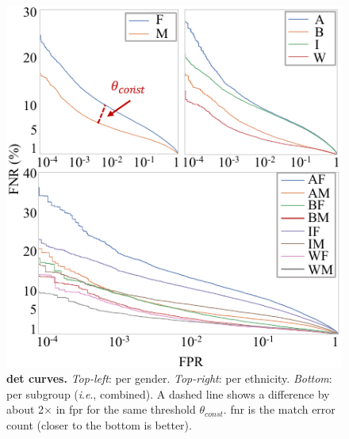 \documentclass[10pt,twocolumn,letterpaper]{article}
\newcommand{\ie}{\textit{i}.\textit{e}., }
\begin{document}
\begin{figure}[!t] 
	\centering    
	\includegraphics[width=\linewidth]{figures/detcurve-improved.pdf}
		\caption{\textbf{\gls{det} curves.} \emph{Top-left}: per gender. \emph{Top-right}: per ethnicity. \emph{Bottom}: per subgroup (\ie combined). A dashed line shows a difference by about 2$\times$ in \gls{fpr} for the same threshold $\theta_{const}$. \gls{fnr} is the match error count (closer to the bottom is better).}
\label{fig:detcurves} 
\end{figure} 
\end{document}
